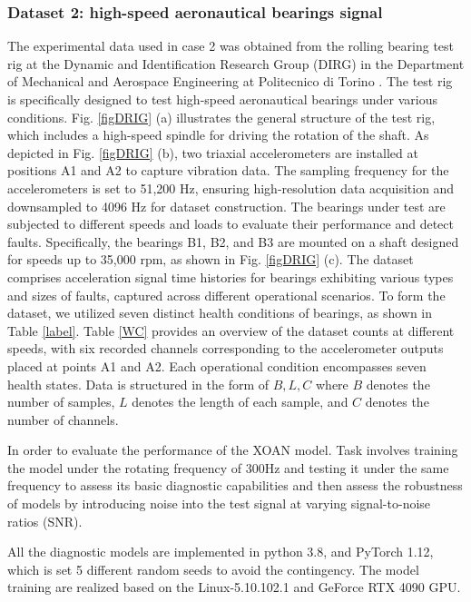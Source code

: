 \documentclass[lettersize,journal]{IEEEtran}
\begin{document}
\subsubsection{Dataset 2: high-speed aeronautical bearings signal}
The experimental data used in case 2 was obtained from the rolling bearing test rig at the Dynamic and Identification Research Group (DIRG) in the Department of Mechanical and Aerospace Engineering at Politecnico di Torino \cite{Daga2019}. The test rig is specifically designed to test high-speed aeronautical bearings under various conditions. Fig. \ref{figDRIG} (a) illustrates the general structure of the test rig, which includes a high-speed spindle for driving the rotation of the shaft. As depicted in Fig. \ref{figDRIG} (b), two triaxial accelerometers are installed at positions A1 and A2 to capture vibration data. The sampling frequency for the accelerometers is set to 51,200 Hz, ensuring high-resolution data acquisition and downsampled to 4096 Hz for dataset construction. The bearings under test are subjected to different speeds and loads to evaluate their performance and detect faults. Specifically, the bearings B1, B2, and B3 are mounted on a shaft designed for speeds up to 35,000 rpm, as shown in Fig. \ref{figDRIG} (c). The dataset comprises acceleration signal time histories for bearings exhibiting various types and sizes of faults, captured across different operational scenarios. To form the dataset, we utilized seven distinct health conditions of bearings, as shown in Table \ref{label}. Table \ref{WC} provides an overview of the dataset counts at different speeds, with six recorded channels corresponding to the accelerometer outputs placed at points A1 and A2. Each operational condition encompasses seven health states. Data is structured in the form of  $B,L,C$ where $B$ denotes the number of samples, $L$ denotes the length of each sample, and $C$ denotes the number of channels. 

 In order to evaluate the performance of the XOAN model. Task involves training the model under the rotating frequency of 300Hz and testing it under the same frequency to assess its basic diagnostic capabilities and then 
 assess the robustness of models by introducing noise into the test signal at varying signal-to-noise ratios (SNR).
 
 All the diagnostic models are implemented in python 3.8,  and PyTorch 1.12, which is set 5 different random seeds to avoid the contingency. The model training are realized based on the Linux-5.10.102.1 and GeForce RTX 4090 GPU.
\end{document}
